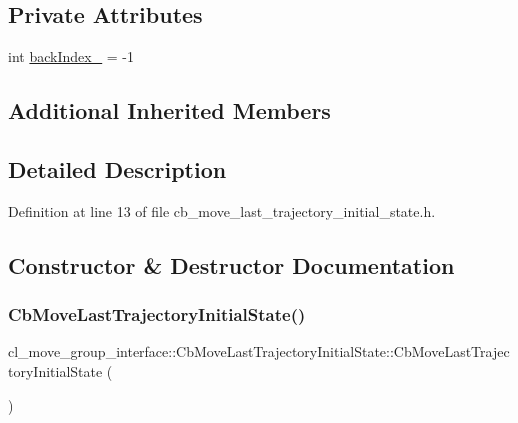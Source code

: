 \subsection*{Private Attributes}
\begin{DoxyCompactItemize}
\item 
int \hyperlink{classcl__move__group__interface_1_1CbMoveLastTrajectoryInitialState_ac4056048a84431f4256beecd03b956b2}{back\+Index\+\_\+} = -\/1
\end{DoxyCompactItemize}
\subsection*{Additional Inherited Members}


\subsection{Detailed Description}


Definition at line 13 of file cb\+\_\+move\+\_\+last\+\_\+trajectory\+\_\+initial\+\_\+state.\+h.



\subsection{Constructor \& Destructor Documentation}
\mbox{\label{classcl__move__group__interface_1_1CbMoveLastTrajectoryInitialState_afbd94e504bf292115bd331d8d0f76266}} 
\subsubsection{\texorpdfstring{Cb\+Move\+Last\+Trajectory\+Initial\+State()}{CbMoveLastTrajectoryInitialState()}\hspace{0.1cm}{\footnotesize\ttfamily [1/2]}}
{\footnotesize\ttfamily cl\+\_\+move\+\_\+group\+\_\+interface\+::\+Cb\+Move\+Last\+Trajectory\+Initial\+State\+::\+Cb\+Move\+Last\+Trajectory\+Initial\+State (\begin{DoxyParamCaption}{ }\end{DoxyParamCaption})}



